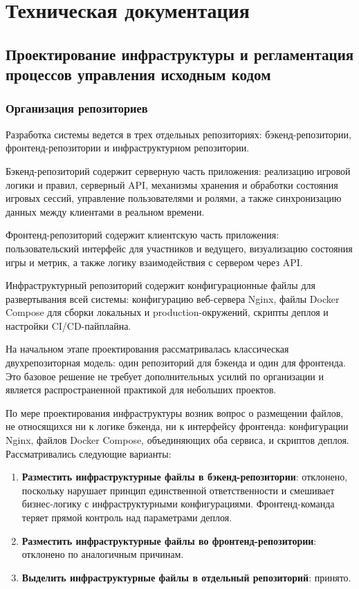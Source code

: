 \section{Техническая документация} %
\subsection{Проектирование инфраструктуры и регламентация процессов управления исходным кодом}
\subsubsection{Организация репозиториев}

Разработка системы ведется в трех отдельных репозиториях: бэкенд-репозитории, фронтенд-репозитории и инфраструктурном репозитории.

Бэкенд-репозиторий содержит серверную часть приложения: реализацию игровой логики и правил, серверный API, механизмы хранения и обработки состояния игровых сессий, управление пользователями и ролями, а также синхронизацию данных между клиентами в реальном времени.

Фронтенд-репозиторий содержит клиентскую часть приложения: пользовательский интерфейс для участников и ведущего, визуализацию состояния игры и метрик, а также логику взаимодействия с сервером через API.

Инфраструктурный репозиторий содержит конфигурационные файлы для развертывания всей системы: конфигурацию веб-сервера Nginx, файлы Docker Compose для сборки локальных и production-окружений, скрипты деплоя и настройки CI/CD-пайплайна.

На начальном этапе проектирования рассматривалась классическая двухрепозиторная модель: один репозиторий для бэкенда и один для фронтенда. Это базовое решение не требует дополнительных усилий по организации и является распространенной практикой для небольших проектов.

По мере проектирования инфраструктуры возник вопрос о размещении файлов, не относящихся ни к логике бэкенда, ни к интерфейсу фронтенда: конфигурации Nginx, файлов Docker Compose, объединяющих оба сервиса, и скриптов деплоя. Рассматривались следующие варианты:

\begin{enumerate}
    \item \textbf{Разместить инфраструктурные файлы в бэкенд-репозитории}: отклонено, поскольку нарушает принцип единственной ответственности и смешивает бизнес-логику с инфраструктурными конфигурациями. Фронтенд-команда теряет прямой контроль над параметрами деплоя.
    \item \textbf{Разместить инфраструктурные файлы во фронтенд-репозитории}: отклонено по аналогичным причинам.
    \item \textbf{Выделить инфраструктурные файлы в отдельный репозиторий}: принято.
\end{enumerate}

